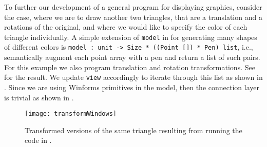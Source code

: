 To further our development of a general program for displaying graphics, consider the case, where we are to draw another two triangles, that are a translation and a rotations of the original, and where we would like to specify the color of each triangle individually. A simple extension of \lstinline{model} in  for generating many shapes of different colors is \lstinline{model : unit -> Size * ((Point []) * Pen) list}, i.e., semantically augment each point array with a pen and return a list of such pairs. For this example we also program translation and rotation transformations. See  for the result.
%
%
We update \lstinline{view} accordingly to iterate through this list as shown in .
%
%
Since we are using Winforms primitives in the model, then the connection layer is trivial as shown in .
%
%
\begin{figure}
  \centering
  \texttt{[image: transformWindows]}
  \caption{Transformed versions of the same triangle resulting from running the code in .}
  \label{fig:transformWindow}
\end{figure}


